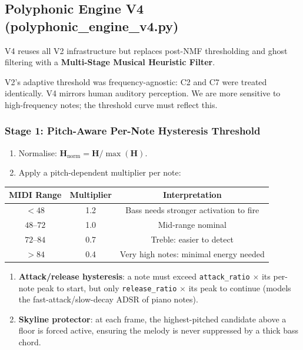 \documentclass[12pt, a4paper]{article}
\begin{document}
\subsection{Polyphonic Engine V4 (polyphonic\_engine\_v4.py)}

V4 reuses all V2 infrastructure but replaces post-NMF thresholding and
ghost filtering with a \textbf{Multi-Stage Musical Heuristic Filter}.

\begin{notebox}
  V2's adaptive threshold was frequency-agnostic: C2 and C7 were treated
  identically. V4 mirrors human auditory perception. We are more sensitive
  to high-frequency notes; the threshold curve must reflect this.
\end{notebox}

\subsubsection{Stage 1: Pitch-Aware Per-Note Hysteresis Threshold}

\begin{enumerate}[leftmargin=2em]
  \item Normalise: $\mathbf{H}_{\text{norm}} = \mathbf{H} / \max(\mathbf{H})$.
  \item Apply a pitch-dependent multiplier per note:
\end{enumerate}

\begin{center}
\begin{tabular}{ccc}
  \toprule
  MIDI Range & Multiplier & Interpretation \\
  \midrule
  $< 48$     & 1.2 & Bass needs stronger activation to fire \\
  $48$--$72$ & 1.0 & Mid-range nominal \\
  $72$--$84$ & 0.7 & Treble: easier to detect \\
  $> 84$     & 0.4 & Very high notes: minimal energy needed \\
  \bottomrule
\end{tabular}
\end{center}

\begin{enumerate}[leftmargin=2em, start=3]
  \item \textbf{Attack/release hysteresis}: a note must exceed
        \texttt{attack\_ratio} $\times$ its per-note peak to start, but
        only \texttt{release\_ratio} $\times$ its peak to continue
        (models the fast-attack/slow-decay ADSR of piano notes).
  \item \textbf{Skyline protector}: at each frame, the highest-pitched
        candidate above a floor is forced active, ensuring the melody
        is never suppressed by a thick bass chord.
\end{enumerate}
\end{document}
